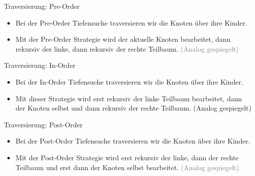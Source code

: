 \begin{frame}{Traversierung: Pre-Order}
    \begin{itemize}[<+(1)->]
        \item Bei der Pre-Order Tiefensuche traversieren wir die Knoten über ihre Kinder.
        \item Mit der Pre-Order Strategie wird der aktuelle Knoten bearbeitet, dann rekursiv der linke, dann rekursiv der rechte Teilbaum.\pause{} \textcolor{gray}{(Analog gespiegelt)}
    \end{itemize}
    \pause\begin{center}
    \end{center}
\end{frame}

\begin{frame}{Traversierung: In-Order}
    \begin{itemize}[<+(1)->]
        \item Bei der In-Order Tiefensuche traversieren wir die Knoten über ihre Kinder.
        \item Mit dieser Strategie wird erst rekursiv der linke Teilbaum bearbeitet, dann der Knoten selbst und dann rekursiv der rechte Teilbaum.\pause{} (Analog gespiegelt)
    \end{itemize}
    \pause{}\begin{center}
    \end{center}
\end{frame}

\begin{frame}{Traversierung: Post-Order}
    \begin{itemize}[<+(1)->]
        \item Bei der Post-Order Tiefensuche traversieren wir die Knoten über ihre Kinder.
        \item Mit der Post-Order Strategie wird erst rekursiv der linke, dann der rechte Teilbaum und erst dann der Knoten selbst bearbeitet. \textcolor{gray}{(Analog gespiegelt)}
    \end{itemize}
    \pause{}\begin{center}
    \end{center}
\end{frame}

